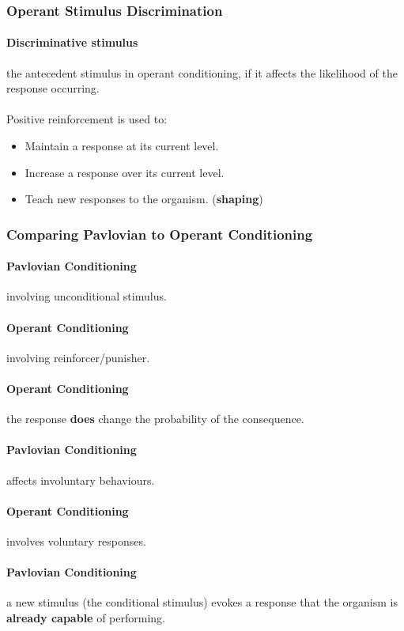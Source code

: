 \documentclass{article}
\begin{document}
	\subsubsection{Operant Stimulus Discrimination}
	\paragraph{Discriminative stimulus} the antecedent stimulus in operant conditioning, if it affects the likelihood of the response occurring.
	\paragraph{} Positive reinforcement is used to:
	\begin{itemize}
		\item Maintain a response at its current level.
		\item Increase a response over its current level.
		\item Teach new responses to the organism. (\textbf{shaping})
	\end{itemize}
	\subsubsection{Comparing Pavlovian to Operant Conditioning}
	\paragraph{Pavlovian Conditioning} involving unconditional stimulus.
	\paragraph{Operant Conditioning} involving reinforcer/punisher.
	\paragraph{Operant Conditioning} the response \textbf{does} change the probability of the consequence.
	\paragraph{Pavlovian Conditioning} affects involuntary behaviours.
	\paragraph{Operant Conditioning} involves voluntary responses.
	\paragraph{Pavlovian Conditioning} a new stimulus (the conditional stimulus) evokes a response that the organism is \textbf{already capable} of performing.
\end{document}

